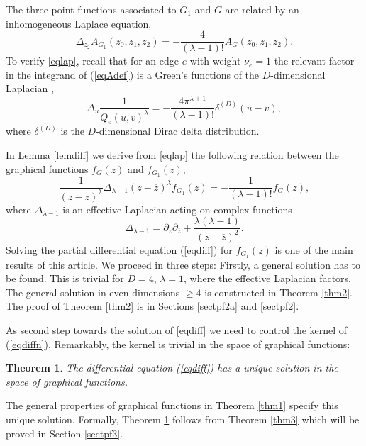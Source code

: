 \documentclass[oneside]{amsart}
\newcommand{\zz}{{\overline{z}}}
\theoremstyle{plain}
\newtheorem{thm}{Theorem}
\begin{document}
The three-point functions associated to $G_1$ and $G$ are related by an inhomogeneous Laplace equation,
\begin{equation}\label{eqlap}
\Delta_{z_2} A_{G_1}(z_0,z_1,z_2)=-\frac{4}{(\lambda-1)!}A_G(z_0,z_1,z_2).
\end{equation}
To verify \eqref{eqlap}, recall that for an edge $e$ with weight $\nu_e=1$ the relevant factor in the integrand of (\ref{eqAdef}) is a Green's functions of the $D$-dimensional Laplacian \cite{IZ},
\begin{equation}\label{eqLprop}
\Delta_u\frac{1}{Q_e(u,v)^\lambda}=-\frac{4\pi^{\lambda+1}}{(\lambda-1)!}\delta^{(D)}(u-v),
\end{equation}
where $\delta^{(D)}$ is the $D$-dimensional Dirac delta distribution.

In Lemma \ref{lemdiff} we derive from \eqref{eqlap} the following relation between the graphical functions $f_G(z)$ and $f_{G_1}(z)$,
\begin{equation}\label{eqdiff}
\frac{1}{(z-\zz)^\lambda}\Delta_{\lambda-1}(z-\zz)^\lambda f_{G_1}(z)=-\frac{1}{(\lambda-1)!}f_G(z),
\end{equation}
where $\Delta_{\lambda-1}$ is an effective Laplacian acting on complex functions 
\begin{equation}\label{eqdiffn}
\Delta_{\lambda-1}=\partial_z\partial_\zz+\frac{\lambda(\lambda-1)}{(z-\zz)^2}.
\end{equation}
Solving the partial differential equation (\ref{eqdiff}) for $f_{G_1}(z)$ is one of the main results of this article. 
We proceed in three steps: Firstly, a general solution has to be found. This is trivial for $D=4$, $\lambda=1$, where the effective Laplacian factors.
The general solution in even dimensions $\geq4$ is constructed in Theorem \ref{thm2}. The proof of Theorem \ref{thm2} is in Sections \ref{sectpf2a} and \ref{sectpf2}.

As second step towards the solution of \eqref{eqdiff} we need to control the kernel of (\ref{eqdiffn}). Remarkably, the kernel is trivial in the space of graphical functions:
\begin{thm}\label{thm01}
The differential equation (\ref{eqdiff}) has a unique solution in the space of graphical functions.
\end{thm}
The general properties of graphical functions in Theorem \ref{thm1} specify this unique solution. 
Formally, Theorem \ref{thm01} follows from Theorem \ref{thm3} which will be proved in Section \ref{sectpf3}.
\end{document}
